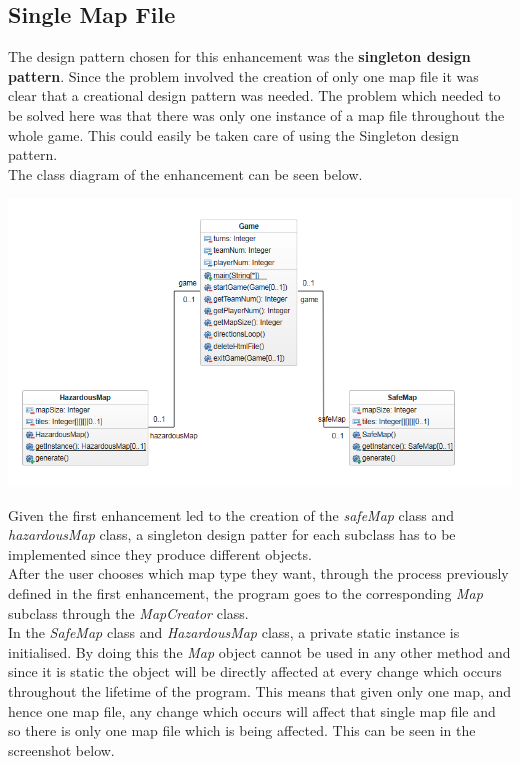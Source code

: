 \documentclass[a4paper,12pt]{extarticle}
\begin{document}
\newpage

\subsection{Single Map File}

The design pattern chosen for this enhancement was the \textbf{singleton design pattern}. Since the problem involved the creation of only one map file it was clear that a creational design pattern was needed. The problem which needed to be solved here was that there was only one instance of a map file throughout the whole game. This could easily be taken care of using the Singleton design pattern.\\

The class diagram of the enhancement can be seen below.\\

\begin{center}
\includegraphics[width=\textwidth]{Enhancement2CD.png}\\
\end{center}

\noindent Given the first enhancement led to the creation of the \textit{safeMap} class and \textit{hazardousMap} class, a singleton design patter for each subclass has to be implemented since they produce different objects.\\

\noindent After the user chooses which map type they want, through the process previously defined in the first enhancement, the program goes to the corresponding \textit{Map} subclass through the \textit{MapCreator} class.\\ 

\noindent In the \textit{SafeMap} class and \textit{HazardousMap} class, a private static instance is initialised. By doing this the \textit{Map} object cannot be used in any other method and since it is static the object will be directly affected at every change which occurs throughout the lifetime of the program. This means that given only one map, and hence one map file, any change which occurs will affect that single map file and so there is only one map file which is being affected. This can be seen in the screenshot below.\\
\end{document}
